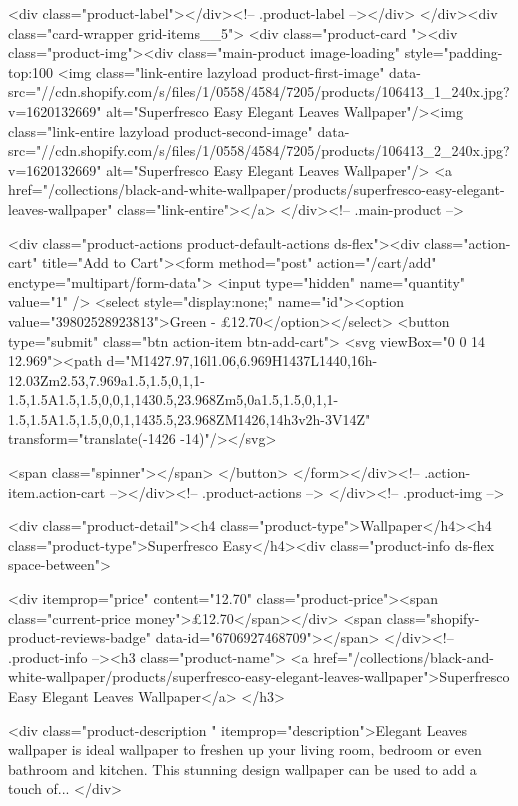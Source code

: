 {{{{{{{<div class="product-label"></div><!-- .product-label --></div>
          </div><div class="card-wrapper grid-items__5">
            <div class="product-card "><div class="product-img"><div class="main-product image-loading" style="padding-top:100%
      <img class="link-entire lazyload product-first-image" data-src="//cdn.shopify.com/s/files/1/0558/4584/7205/products/106413_1_240x.jpg?v=1620132669" alt="Superfresco Easy Elegant Leaves Wallpaper"/><img class="link-entire lazyload product-second-image" data-src="//cdn.shopify.com/s/files/1/0558/4584/7205/products/106413_2_240x.jpg?v=1620132669" alt="Superfresco Easy Elegant Leaves Wallpaper"/>
      <a href="/collections/black-and-white-wallpaper/products/superfresco-easy-elegant-leaves-wallpaper" class="link-entire"></a>
    </div><!-- .main-product -->
  
<div class="product-actions product-default-actions ds-flex"><div class="action-cart" title="Add to Cart"><form method="post" action="/cart/add" enctype="multipart/form-data">
            <input type="hidden" name="quantity" value="1" />
            <select style="display:none;" name="id"><option value="39802528923813">Green - £12.70</option></select>
            <button type="submit" class="btn action-item btn-add-cart">
              <svg viewBox="0 0 14 12.969"><path d="M1427.97,16l1.06,6.969H1437L1440,16h-12.03Zm2.53,7.969a1.5,1.5,0,1,1-1.5,1.5A1.5,1.5,0,0,1,1430.5,23.968Zm5,0a1.5,1.5,0,1,1-1.5,1.5A1.5,1.5,0,0,1,1435.5,23.968ZM1426,14h3v2h-3V14Z" transform="translate(-1426 -14)"/></svg>

              <span class="spinner"></span>
            </button>
          </form></div><!-- .action-item.action-cart --></div><!-- .product-actions -->
</div><!-- .product-img -->

<div class="product-detail"><h4 class="product-type">Wallpaper</h4><h4 class="product-type">Superfresco Easy</h4><div class="product-info ds-flex space-between">
    
<div itemprop="price" content="12.70" class="product-price"><span class="current-price money">£12.70</span></div>
    <span class="shopify-product-reviews-badge" data-id="6706927468709"></span>
  </div><!-- .product-info --><h3 class="product-name">
      <a href="/collections/black-and-white-wallpaper/products/superfresco-easy-elegant-leaves-wallpaper">Superfresco Easy Elegant Leaves Wallpaper</a>
    </h3>
    
<div class="product-description " itemprop="description">Elegant Leaves wallpaper is ideal wallpaper to freshen up your living room, bedroom or even bathroom and kitchen. This stunning design wallpaper can be used to add a touch of...
</div>



}}}}}}}
